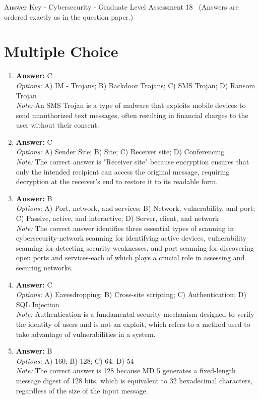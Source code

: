 \documentclass[12pt]{article}
\begin{document}
\begin{center}
Answer Key - Cybersecurity - Graduate Level Assessment 18 \
\small (Answers are ordered exactly as in the question paper.)
\end{center}

\section*{Multiple Choice}
\begin{enumerate}[label=\arabic*.]
\item \textbf{Answer:} C
\\ \textit{Options:} A) IM - Trojans; B) Backdoor Trojans; C) SMS Trojan; D) Ransom Trojan
\\ \textit{Note:} An SMS Trojan is a type of malware that exploits mobile devices to send unauthorized text messages, often resulting in financial charges to the user without their consent.
\item \textbf{Answer:} C
\\ \textit{Options:} A) Sender Site; B) Site; C) Receiver site; D) Conferencing
\\ \textit{Note:} The correct answer is "Receiver site" because encryption ensures that only the intended recipient can access the original message, requiring decryption at the receiver's end to restore it to its readable form.
\item \textbf{Answer:} B
\\ \textit{Options:} A) Port, network, and services; B) Network, vulnerability, and port; C) Passive, active, and interactive; D) Server, client, and network
\\ \textit{Note:} The correct answer identifies three essential types of scanning in cybersecurity-network scanning for identifying active devices, vulnerability scanning for detecting security weaknesses, and port scanning for discovering open ports and services-each of which plays a crucial role in assessing and securing networks.
\item \textbf{Answer:} C
\\ \textit{Options:} A) Eavesdropping; B) Cross-site scripting; C) Authentication; D) SQL Injection
\\ \textit{Note:} Authentication is a fundamental security mechanism designed to verify the identity of users and is not an exploit, which refers to a method used to take advantage of vulnerabilities in a system.
\item \textbf{Answer:} B
\\ \textit{Options:} A) 160; B) 128; C) 64; D) 54
\\ \textit{Note:} The correct answer is 128 because MD 5 generates a fixed-length message digest of 128 bits, which is equivalent to 32 hexadecimal characters, regardless of the size of the input message.
\end{enumerate}
\end{document}
